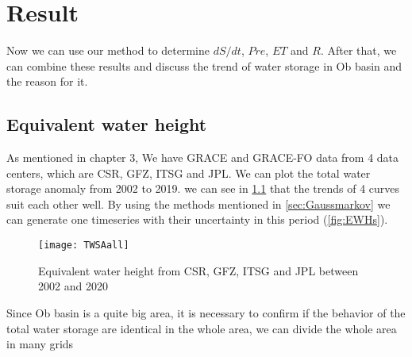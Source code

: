 \chapter{Result}
Now we can use our method to determine $dS/dt$, $Pre$, $ET$ and $R$. After that, we can combine these results and discuss the trend of water storage in Ob basin and the reason for it.
\section{Equivalent water height}
As mentioned in chapter 3, We have GRACE and GRACE-FO data from 4 data centers, which are CSR, GFZ, ITSG and JPL. We can plot the total water storage anomaly from 2002 to 2019. we can see in \ref{fig:4centers} that the trends of 4 curves suit each other well. By using the methods mentioned in \ref{sec:Gaussmarkov} we can generate one timeseries with their uncertainty in this period (\ref{fig:EWHs}).
\begin{figure}[htbp]
	\centering
	\texttt{[image: TWSAall]} %
	\caption{Equivalent water height from CSR, GFZ, ITSG and JPL between 2002 and 2020} 
	\label{fig:4centers}
\end{figure}


Since Ob basin is a quite big area, it is necessary to confirm if the behavior of the total water storage are identical in the whole area, we can divide the whole area in many grids \\\\


